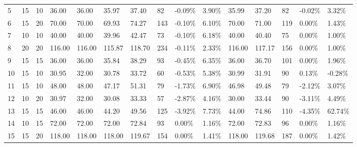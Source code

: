 \documentclass[
  a4paper,
,tablecaptionabove
]{scrartcl}
\numberwithin{equation}{section}
\begin{document}
\begin{longtable}{l|ll|ll|lllll|lllll}
  5  & 15                         & 10                         & 36.00                     & 36.00       & 35.97         & 37.40  & 82  & -0.09\% & 3.90\% & 35.99  & 37.20  & 82  & -0.02\% & 3.32\%  \\
  6  & 15                         & 20                         & 70.00                     & 70.00       & 69.93         & 74.27  & 143 & -0.10\% & 6.10\% & 70.00  & 71.00  & 119 & 0.00\%  & 1.43\%  \\
  7  & 10                         & 10                         & 40.00                     & 40.00       & 39.96         & 42.47  & 73  & -0.10\% & 6.18\% & 40.00  & 40.40  & 75  & 0.00\%  & 1.00\%  \\
  8  & 20                         & 20                         & 116.00                    & 116.00      & 115.87        & 118.70 & 234 & -0.11\% & 2.33\% & 116.00 & 117.17 & 156 & 0.00\%  & 1.00\%  \\
  9  & 15                         & 15                         & 36.00                     & 36.00       & 35.84         & 38.29  & 93  & -0.45\% & 6.35\% & 36.00  & 36.70  & 101 & 0.00\%  & 1.96\%  \\
  10 & 15                         & 10                         & 30.95                     & 32.00       & 30.78         & 33.72  & 60  & -0.53\% & 5.38\% & 30.99  & 31.91  & 90  & 0.13\%  & -0.28\% \\
  11 & 15                         & 10                         & 48.00                     & 48.00       & 47.17         & 51.31  & 79  & -1.73\% & 6.90\% & 46.98  & 49.48  & 79  & -2.12\% & 3.07\%  \\
  12 & 10                         & 20                         & 30.97                     & 32.00       & 30.08         & 33.33  & 57  & -2.87\% & 4.16\% & 30.00  & 33.44  & 90  & -3.11\% & 4.49\%  \\
  13 & 15                         & 15                         & 46.00                     & 46.00       & 44.20         & 49.56  & 125 & -3.92\% & 7.73\% & 44.00  & 74.86  & 110 & -4.35\% & 62.74\% \\
  14 & 10                         & 15                         & 72.00                     & 72.00       & 72.00         & 72.84  & 93  & 0.00\%  & 1.16\% & 72.00  & 72.83  & 96  & 0.00\%  & 1.16\%  \\
  15 & 15                         & 20                         & 118.00                    & 118.00      & 118.00        & 119.67 & 154 & 0.00\%  & 1.41\% & 118.00 & 119.68 & 187 & 0.00\%  & 1.42\%  \\

\end{longtable}
\end{document}
